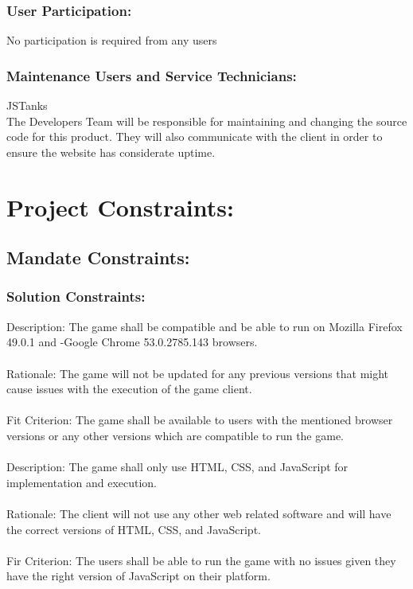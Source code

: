\documentclass{article}
\begin{document}
\subsubsection{User Participation:}
No participation is required from any users

\subsubsection{Maintenance Users and Service Technicians:}
JSTanks\\

The Developers Team will be responsible for maintaining and changing the source
code for this product. They will also communicate with the client in order to
ensure the website has considerate uptime.

\section{Project Constraints:} 
\subsection{Mandate Constraints:}
\subsubsection{Solution Constraints:}
 Description: The game shall be compatible
and be able to run on Mozilla Firefox 49.0.1 and -Google Chrome 53.0.2785.143
browsers.\\\\ Rationale: The game will not be updated for any previous versions
that might cause issues with the execution of the game client.\\\\ Fit
Criterion: The game shall be available to users with the mentioned browser
versions or any other versions which are compatible to run the game.\\\\
Description: The game shall only use HTML, CSS, and JavaScript for
implementation and execution.\\\\ Rationale: The client will not use any other
web related software and will have the correct versions of HTML, CSS, and
JavaScript. \\\\ Fir Criterion: The users shall be able to run the game with no
issues given they have the right version of JavaScript on their platform. \\\\
\end{document}

